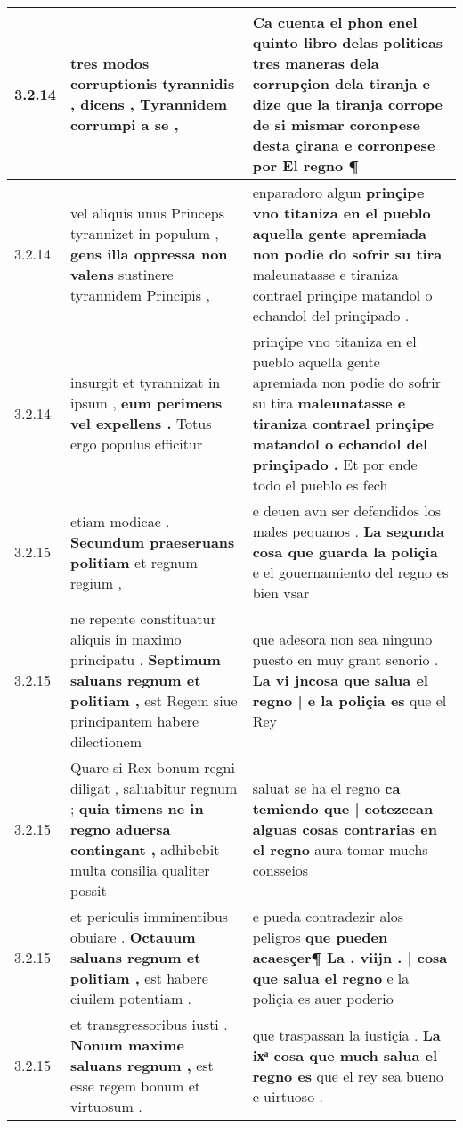 \begin{tabular}{|p{1cm}|p{6.5cm}|p{6.5cm}|}
3.2.14 & tres modos corruptionis tyrannidis , \textbf{ dicens , } Tyrannidem corrumpi a se , & Ca cuenta el phon enel quinto libro delas politicas tres maneras dela corrupçion dela tiranja \textbf{ e dize que la tiranja corrope de si mismar coronpese desta çirana } e corronpese por El regno ¶ \\\hline
3.2.14 & vel aliquis unus Princeps tyrannizet in populum , \textbf{ gens illa oppressa non valens } sustinere tyrannidem Principis , & enparadoro algun \textbf{ prinçipe vno titaniza en el pueblo aquella gente apremiada non podie do sofrir su tira } maleunatasse e tiraniza contrael prinçipe matandol o echandol del prinçipado . \\\hline
3.2.14 & insurgit et tyrannizat in ipsum , \textbf{ eum perimens vel expellens . } Totus ergo populus efficitur & prinçipe vno titaniza en el pueblo aquella gente apremiada non podie do sofrir su tira \textbf{ maleunatasse e tiraniza contrael prinçipe matandol o echandol del prinçipado . } Et por ende todo el pueblo es fech \\\hline
3.2.15 & etiam modicae . \textbf{ Secundum praeseruans politiam } et regnum regium , & e deuen avn ser defendidos los males pequanos . \textbf{ La segunda cosa que guarda la poliçia } e el gouernamiento del regno es bien vsar \\\hline
3.2.15 & ne repente constituatur aliquis in maximo principatu . \textbf{ Septimum saluans regnum et politiam , } est Regem siue principantem habere dilectionem & que adesora non sea ninguno puesto en muy grant senorio . \textbf{ La vi jncosa que salua el regno | e la poliçia es } que el Rey \\\hline
3.2.15 & Quare si Rex bonum regni diligat , saluabitur regnum ; \textbf{ quia timens ne in regno aduersa contingant , } adhibebit multa consilia qualiter possit & saluat se ha el regno \textbf{ ca temiendo que | cotezccan alguas cosas contrarias en el regno } aura tomar muchs consseios \\\hline
3.2.15 & et periculis imminentibus obuiare . \textbf{ Octauum saluans regnum et politiam , } est habere ciuilem potentiam . & e pueda contradezir alos peligros \textbf{ que pueden acaesçer¶ La . viijn . | cosa que salua el regno } e la poliçia es auer poderio \\\hline
3.2.15 & et transgressoribus iusti . \textbf{ Nonum maxime saluans regnum , } est esse regem bonum et virtuosum . & que traspassan la iustiçia . \textbf{ La ixͣ cosa que much salua el regno es } que el rey sea bueno e uirtuoso . \\\hline

\end{tabular}
